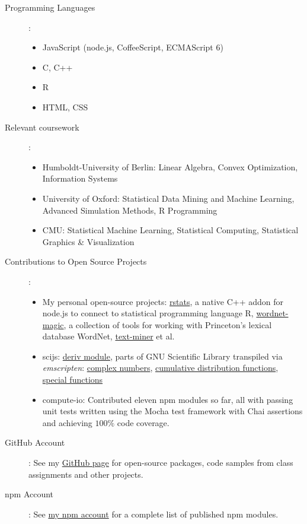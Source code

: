 \documentclass{scrartcl}
\begin{document}
\begin{description}
   \item [Programming Languages]:
   \begin{itemize}
   \item JavaScript (node.js, CoffeeScript, ECMAScript 6)
   \item C, C++
   \item R
   \item HTML, CSS
   \end{itemize}
   \item [Relevant coursework]:
   \begin{itemize}
   \item Humboldt-University of Berlin: Linear Algebra, Convex Optimization, Information Systems
   \item University of Oxford: Statistical Data Mining
and Machine Learning, Advanced Simulation Methods, R Programming
   \item CMU: Statistical Machine Learning, Statistical Computing, Statistical Graphics \& Visualization
   \end{itemize}
   \item [Contributions to Open Source Projects]: 
   \begin{itemize}
   \item My personal open-source projects: \href{https://github.com/Planeshifter/node-Rstats}{rstats}, a native C++ addon for node.js to connect to statistical programming language R, \href{https://github.com/Planeshifter/node-wordnet-magic}{wordnet-magic}, a collection of tools for working with Princeton's lexical database WordNet, \href{https://github.com/Planeshifter/text-miner}{text-miner} et al.
   \item scijs: \href{https://github.com/scijs/deriv}{deriv module}, parts of GNU Scientific Library transpiled via \emph{emscripten}: \href{https://github.com/scijs/gsl-complex}{complex numbers}, 
\href{https://github.com/scijs/gsl-cdf}{cumulative distribution functions},
\href{https://github.com/scijs/gsl-sf}{special functions}
   \item compute-io: Contributed eleven npm modules so far, all with passing unit tests written using the Mocha test framework with Chai assertions and achieving $100\%$ code coverage.
   \end{itemize}
      \item [GitHub Account]: See my \href{https://github.com/Planeshifter}{GitHub page} for open-source packages, code samples from class assignments and other projects.
      \item [npm Account]: See \href{https://www.npmjs.com/~planeshifter}{my npm account} for a complete list of published npm modules.
\end{description}
\end{document}
